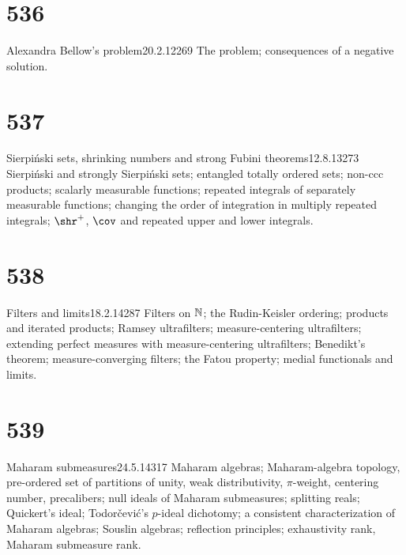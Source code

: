 \section{536}{Alexandra Bellow's problem}{20.2.12}{}{269}
{The problem;  consequences of a negative solution.}

\section{537}{Sierpi\'nski sets, shrinking numbers and strong Fubini
theorems}{12.8.13}{}{273}
{Sierpi\'nski and strongly Sierpi\'nski sets;  entangled totally ordered
sets;  non-ccc products;  scalarly measurable functions;  repeated
integrals of separately measurable functions;  changing the order of
integration in multiply repeated integrals;  $\shr^+$, $\cov$ and
repeated upper and lower integrals.}

\section{538}{Filters and limits}{18.2.14}{}{287}
{Filters on $\Bbb{N}$;  the Rudin-Keisler ordering;  products and iterated
products;  Ramsey ultrafilters;
measure-centering ultrafilters;  extending perfect measures with
measure-centering ultrafilters;  Benedikt's theorem;  
measure-converging filters;  the Fatou property;  medial
functionals and limits.}

\section{539}{Maharam submeasures}{24.5.14}{}{317}
{Maharam algebras;  Maharam-algebra topology,
pre-ordered set of partitions of unity,
weak distributivity, $\pi$-weight, centering number, precalibers;  
null ideals of Maharam submeasures;  splitting reals;   Quickert's ideal;
Todor\v{c}evi\'c's $p$-ideal dichotomy;  a consistent
characterization of Maharam algebras;  Souslin algebras;  reflection
principles;  exhaustivity rank, Maharam submeasure rank.}



